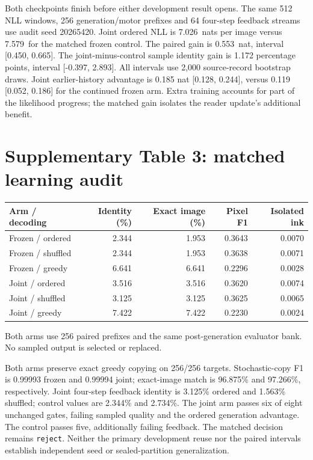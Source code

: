 \documentclass[10pt,a4paper]{article}
\newcommand{\JointNll}{7.026}
\newcommand{\ControlNll}{7.579}
\newcommand{\JointNllGain}{0.553}
\newcommand{\JointNllLow}{0.450}
\newcommand{\JointNllHigh}{0.665}
\newcommand{\JointDecision}{reject}
\begin{document}
Both checkpoints finish before either development result opens. The same
512 NLL windows, 256 generation/motor prefixes and 64 four-step feedback
streams use audit seed 20265420. Joint ordered NLL is \JointNll\ nats per
image versus \ControlNll\ for the matched frozen control. The paired gain is
\JointNllGain\ nat, interval [\JointNllLow, \JointNllHigh]. The joint-minus-control
sample identity gain is 1.172 percentage points, interval [-0.397, 2.893].
All intervals use 2,000 source-record bootstrap draws. Joint earlier-history
advantage is 0.185 nat [0.128, 0.244], versus 0.119 [0.052, 0.186] for the
continued frozen arm. Extra training accounts for part of the likelihood
progress; the matched gain isolates the reader update's additional benefit.

\section*{Supplementary Table 3: matched learning audit}
\begin{center}\begin{tabular}{lrrrr}\toprule
Arm / decoding & Identity (\%) & Exact image (\%) & Pixel F1 & Isolated ink \\
\midrule
Frozen / ordered & 2.344 & 1.953 & 0.3643 & 0.0070 \\
Frozen / shuffled & 2.344 & 1.953 & 0.3638 & 0.0071 \\
Frozen / greedy & 6.641 & 6.641 & 0.2296 & 0.0028 \\
Joint / ordered & 3.516 & 3.516 & 0.3620 & 0.0074 \\
Joint / shuffled & 3.125 & 3.125 & 0.3625 & 0.0065 \\
Joint / greedy & 7.422 & 7.422 & 0.2230 & 0.0024 \\
\bottomrule\end{tabular}\end{center}
Both arms use 256 paired prefixes and the same post-generation evaluator bank. No sampled output is selected or replaced.


Both arms preserve exact greedy copying on 256/256 targets. Stochastic-copy
F1 is 0.99993 frozen and 0.99994 joint; exact-image match is 96.875\% and
97.266\%, respectively. Joint four-step feedback identity is 3.125\% ordered
and 1.563\% shuffled; control values are 2.344\% and 2.734\%. The joint arm
passes six of eight unchanged gates, failing sampled quality and the ordered
generation advantage. The control passes five, additionally failing feedback.
The matched decision remains \texttt{\JointDecision}. Neither the primary
development reuse nor the paired intervals establish independent seed or
sealed-partition generalization.
\end{document}
